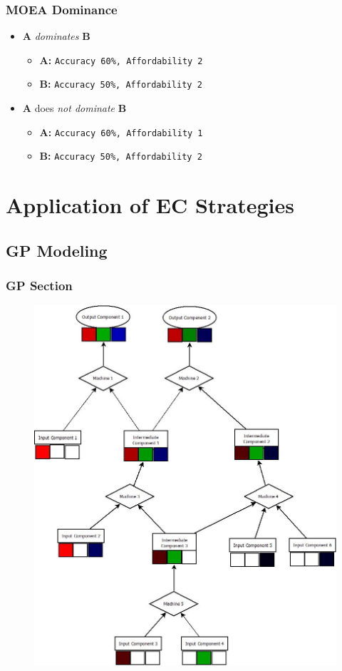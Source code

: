 \documentclass{beamer}
\begin{document}
\begin{frame}[fragile]
\frametitle{MOEA Dominance}
\begin{itemize}
\item \textbf{A} \textit{dominates} \textbf{B}
	\begin{itemize}
	\item \textbf{A:} \verb|Accuracy 60%, Affordability 2|
	\item \textbf{B:} \verb|Accuracy 50%, Affordability 2|
	\end{itemize}
\item \textbf{A} does \textit{not dominate} \textbf{B}
	\begin{itemize}
	\item \textbf{A:} \verb|Accuracy 60%, Affordability 1|
	\item \textbf{B:} \verb|Accuracy 50%, Affordability 2|
	\end{itemize}
\end{itemize}
\end{frame}

\section{Application of EC Strategies}

\subsection{GP Modeling}
\begin{frame}
\frametitle{GP Section}
\begin{figure}
\includegraphics[width=0.5\linewidth]{BaseModel.jpeg}
\end{figure}
\end{frame}
\end{document}
